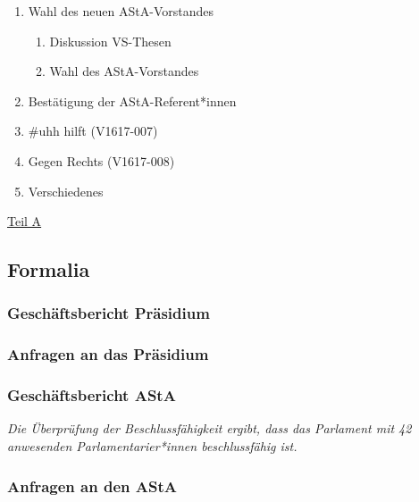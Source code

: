 \documentclass[ngerman,headheight=70pt]{scrartcl}
\begin{document}
\begin{enumerate}[label={\textbf{Top \theenumi}},leftmargin=*]
        \item Wahl des neuen AStA-Vorstandes
            \begin{enumerate}
                \item Diskussion VS-Thesen
                \item Wahl des AStA-Vorstandes
            \end{enumerate}
        \item Bestätigung der AStA-Referent*innen
        \item \#uhh hilft (V1617-007)
        \item Gegen Rechts (V1617-008)
        \item Verschiedenes
    \end{enumerate}

    \newpage


    {\Large \underline{Teil A}}

    \subsection{Formalia}

    \subsubsection{Geschäftsbericht Präsidium}

    \subsubsection{Anfragen an das Präsidium}

    \subsubsection{Geschäftsbericht AStA}

    \textit{Die Überprüfung der Beschlussfähigkeit ergibt, dass das Parlament
    mit 42 anwesenden Parlamentarier*innen beschlussfähig ist.}

    \subsubsection{Anfragen an den AStA}
\end{document}
